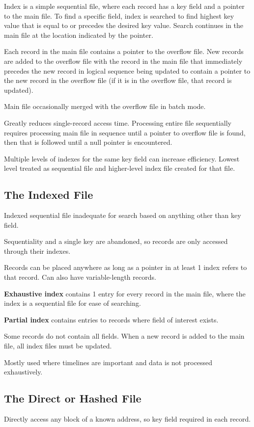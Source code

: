 \documentclass[11pt]{article}
\begin{document}
Index is a simple sequential file, where each record has a key field and a pointer to the main file.
To find a specific field, index is searched to find highest key value that is equal to or precedes the
desired key value. Search continues in the main file at the location indicated by the pointer.

Each record in the main file contains a pointer to the overflow file.
New records are added to the overflow file with the record in the main file that immediately precedes
the new record in logical sequence being updated to contain a pointer to the new record in the
overflow file (if it is in the overflow file, that record is updated).

Main file occasionally merged with the overflow file in batch mode.

Greatly reduces single-record access time.
Processing entire file sequentially requires processing main file in sequence until a pointer to overflow
file is found, then that is followed until a null pointer is encountered.

Multiple levels of indexes for the same key field can increase efficiency.
Lowest level treated as sequential file and higher-level index file created for that file.
\subsection{The Indexed File}
\label{sec:orge0d4ea0}
Indexed sequential file inadequate for search based on anything other than key field.

Sequentiality and a single key are abandoned, so records are only accessed through their indexes.

Records can be placed anywhere as long as a pointer in at least 1 index refers to that record.
Can also have variable-length records.

\textbf{Exhaustive index} contains 1 entry for every record in the main file, where the index is a sequential file for ease of searching.

\textbf{Partial index} contains entries to records where field of interest exists.

Some records do not contain all fields.
When a new record is added to the main file, all index files must be updated.

Mostly used where timelines are important and data is not processed exhaustively.
\subsection{The Direct or Hashed File}
\label{sec:org87a9224}
Directly access any block of a known address, so key field required in each record.
\end{document}
